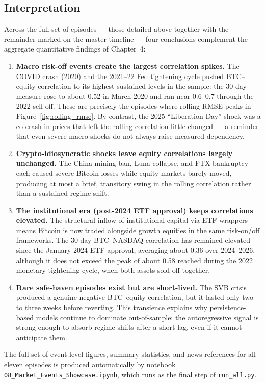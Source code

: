 \subsection*{Interpretation}

Across the full set of episodes --- those detailed above together with the remainder
marked on the master timeline --- four conclusions complement the aggregate
quantitative findings of Chapter~4:

\begin{enumerate}
    \item \textbf{Macro risk-off events create the largest correlation spikes.}
    The COVID crash (2020) and the 2021--22 Fed tightening cycle pushed BTC--equity
    correlation to its highest sustained levels in the sample: the 30-day measure rose
    to about 0.52 in March 2020 and ran near 0.6--0.7 through the 2022 sell-off. These
    are precisely the episodes where rolling-RMSE peaks in Figure~\ref{fig:rolling_rmse}.
    By contrast, the 2025 ``Liberation Day'' shock was a co-crash in prices that left the
    rolling correlation little changed --- a reminder that even severe macro shocks do
    not always raise measured dependency.

    \item \textbf{Crypto-idiosyncratic shocks leave equity correlations largely unchanged.}
    The China mining ban, Luna collapse, and FTX bankruptcy each caused severe Bitcoin
    losses while equity markets barely moved, producing at most a brief, transitory
    swing in the rolling correlation rather than a sustained regime shift.

    \item \textbf{The institutional era (post-2024 ETF approval) keeps correlations elevated.}
    The structural inflow of institutional capital via ETF wrappers means Bitcoin is
    now traded alongside growth equities in the same risk-on/off frameworks. The 30-day
    BTC--NASDAQ correlation has remained elevated since the January 2024 ETF approval,
    averaging about 0.36 over 2024--2026, although it does not exceed the peak of about
    0.58 reached during the 2022 monetary-tightening cycle, when both assets sold off together.

    \item \textbf{Rare safe-haven episodes exist but are short-lived.}
    The SVB crisis produced a genuine negative BTC--equity correlation, but it lasted
    only two to three weeks before reverting. This transience explains why persistence-based
    models continue to dominate out-of-sample: the autoregressive signal is strong
    enough to absorb regime shifts after a short lag, even if it cannot anticipate them.
\end{enumerate}

The full set of event-level figures, summary statistics, and news references for all
eleven episodes is produced automatically by notebook
\texttt{08\_Market\_Events\_Showcase.ipynb}, which runs as the final step of
\texttt{run\_all.py}.

\clearpage
